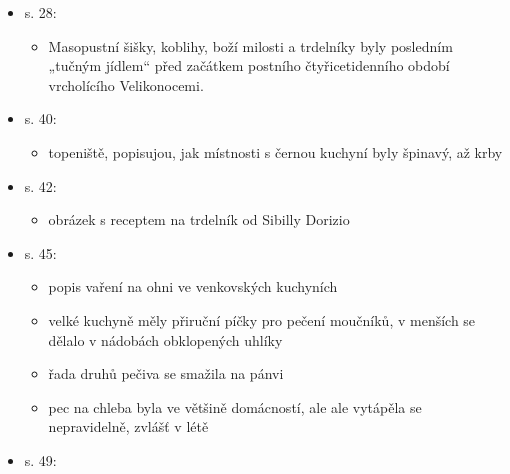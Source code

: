 \begin{itemize}
\begin{itemize}
    \begin{itemize}
    \tightlist
    \item
      masopustní pečivo mezi Uh. Hradištěm a Uh. Brodem, ale
      připravovaly se i k jinejm slavnostním příležitostem
    \item
      kynutý těsto na kónickym válci nad žhavými uhlíky
    \item
      po upečení se trdelníky krájely na kolečka
    \item
      trdelníky byly obecně pečivo pro slavnostní příležitosti -
      masopust, do kouta, rodinné oslavy
    \item
      v jižních Čechách se pekly při první návštěvě ženicha v rodině
    \item
      koblihy pekárny po 2. světový válce zařadily do sortimentu pro
      snadnou výrobu, málokdo si uvědomuje, že původně byly slavnostní
      pečivo
    \end{itemize}
  \item
    s. 28:

    \begin{itemize}
    \tightlist
    \item
      Masopustní šišky, koblihy, boží milosti a trdelníky byly posledním
      „tučným jídlem`` před začátkem postního čtyřicetidenního období
      vrcholícího Velikonocemi.
    \end{itemize}
  \item
    s. 40:

    \begin{itemize}
    \tightlist
    \item
      topeniště, popisujou, jak místnosti s černou kuchyní byly špinavý,
      až krby
    \end{itemize}
  \item
    s. 42:

    \begin{itemize}
    \tightlist
    \item
      obrázek s receptem na trdelník od Sibilly Dorizio
    \end{itemize}
  \item
    s. 45:

    \begin{itemize}
    \tightlist
    \item
      popis vaření na ohni ve venkovských kuchyních
    \item
      velké kuchyně měly přiruční píčky pro pečení moučníků, v menších
      se dělalo v nádobách obklopených uhlíky
    \item
      řada druhů pečiva se smažila na pánvi
    \item
      pec na chleba byla ve většině domácností, ale ale vytápěla se
      nepravidelně, zvlášť v létě
    \end{itemize}
  \item
    s. 49:


\end{itemize}
\end{itemize}
